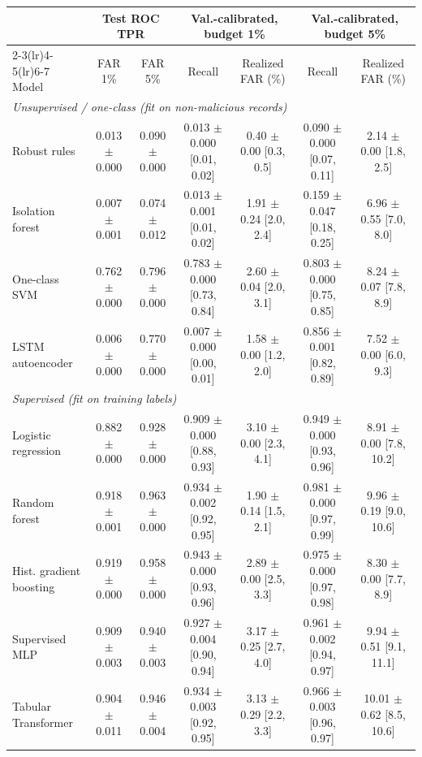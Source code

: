 \begin{tabular}{lcccccc}
\toprule
& \multicolumn{2}{c}{Test ROC TPR} & \multicolumn{2}{c}{Val.-calibrated, budget 1\%} & \multicolumn{2}{c}{Val.-calibrated, budget 5\%} \\
\cmidrule(lr){2-3}\cmidrule(lr){4-5}\cmidrule(lr){6-7}
Model & FAR 1\% & FAR 5\% & Recall & Realized FAR (\%) & Recall & Realized FAR (\%) \\
\midrule
\multicolumn{7}{l}{\textit{Unsupervised / one-class (fit on non-malicious records)}} \\
Robust rules & 0.013 $\pm$ 0.000 & 0.090 $\pm$ 0.000 & 0.013 $\pm$ 0.000 [0.01, 0.02] & 0.40 $\pm$ 0.00 [0.3, 0.5] & 0.090 $\pm$ 0.000 [0.07, 0.11] & 2.14 $\pm$ 0.00 [1.8, 2.5] \\
Isolation forest & 0.007 $\pm$ 0.001 & 0.074 $\pm$ 0.012 & 0.013 $\pm$ 0.001 [0.01, 0.02] & 1.91 $\pm$ 0.24 [2.0, 2.4] & 0.159 $\pm$ 0.047 [0.18, 0.25] & 6.96 $\pm$ 0.55 [7.0, 8.0] \\
One-class SVM & 0.762 $\pm$ 0.000 & 0.796 $\pm$ 0.000 & 0.783 $\pm$ 0.000 [0.73, 0.84] & 2.60 $\pm$ 0.04 [2.0, 3.1] & 0.803 $\pm$ 0.000 [0.75, 0.85] & 8.24 $\pm$ 0.07 [7.8, 8.9] \\
LSTM autoencoder & 0.006 $\pm$ 0.000 & 0.770 $\pm$ 0.000 & 0.007 $\pm$ 0.000 [0.00, 0.01] & 1.58 $\pm$ 0.00 [1.2, 2.0] & 0.856 $\pm$ 0.001 [0.82, 0.89] & 7.52 $\pm$ 0.00 [6.0, 9.3] \\
\midrule
\multicolumn{7}{l}{\textit{Supervised (fit on training labels)}} \\
Logistic regression & 0.882 $\pm$ 0.000 & 0.928 $\pm$ 0.000 & 0.909 $\pm$ 0.000 [0.88, 0.93] & 3.10 $\pm$ 0.00 [2.3, 4.1] & 0.949 $\pm$ 0.000 [0.93, 0.96] & 8.91 $\pm$ 0.00 [7.8, 10.2] \\
Random forest & 0.918 $\pm$ 0.001 & 0.963 $\pm$ 0.000 & 0.934 $\pm$ 0.002 [0.92, 0.95] & 1.90 $\pm$ 0.14 [1.5, 2.1] & 0.981 $\pm$ 0.000 [0.97, 0.99] & 9.96 $\pm$ 0.19 [9.0, 10.6] \\
Hist. gradient boosting & 0.919 $\pm$ 0.000 & 0.958 $\pm$ 0.000 & 0.943 $\pm$ 0.000 [0.93, 0.96] & 2.89 $\pm$ 0.00 [2.5, 3.3] & 0.975 $\pm$ 0.000 [0.97, 0.98] & 8.30 $\pm$ 0.00 [7.7, 8.9] \\
Supervised MLP & 0.909 $\pm$ 0.003 & 0.940 $\pm$ 0.003 & 0.927 $\pm$ 0.004 [0.90, 0.94] & 3.17 $\pm$ 0.25 [2.7, 4.0] & 0.961 $\pm$ 0.002 [0.94, 0.97] & 9.94 $\pm$ 0.51 [9.1, 11.1] \\
Tabular Transformer & 0.904 $\pm$ 0.011 & 0.946 $\pm$ 0.004 & 0.934 $\pm$ 0.003 [0.92, 0.95] & 3.13 $\pm$ 0.29 [2.2, 3.3] & 0.966 $\pm$ 0.003 [0.96, 0.97] & 10.01 $\pm$ 0.62 [8.5, 10.6] \\
\bottomrule
\end{tabular}
